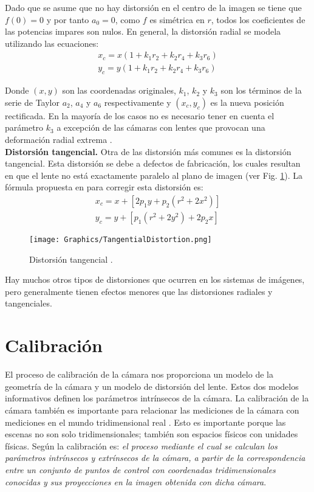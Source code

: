 Dado que se asume que no hay distorsión en el centro de la imagen se tiene que $f(0)=0$ y por tanto $a_0=0$, como $f$ es simétrica en $r$, todos los coeficientes de las potencias impares son nulos. En general, la distorsión radial se modela utilizando las ecuaciones:
\begin{gather*}
    x_c = x(1 + k_1 r_2 + k_2 r_4 + k_3 r_6)\\
    y_c = y(1 + k_1 r_2 + k_2 r_4 + k_3 r_6)
\end{gather*}

Donde $(x, y)$ son las coordenadas originales, $k_1$, $k_2$ y $k_3$ son los términos de la serie de Taylor $a_2$, $a_4$ y $a_6$ respectivamente y $(x_c, y_c)$ es la nueva posición rectificada. En la mayoría de los casos no es necesario tener en cuenta el parámetro $k_3$ a excepción de las cámaras con lentes que provocan una deformación radial extrema \cite{David}.\\

\textbf{Distorsión tangencial.}
Otra de las distorsión más comunes es la distorsión tangencial. Esta distorsión se debe a defectos de fabricación, los cuales resultan en que el lente no está exactamente paralelo al plano de imagen (ver Fig. \ref{fig:TangentialDistortion}). La fórmula propuesta en \cite{GaryAdrian} para corregir esta distorsión es:
\begin{gather*}
    x_c = x + [2p_1y + p_2(r^2 + 2x^2)]\\
    y_c = y + [p_1(r^2 + 2y^2) + 2p_2x]
\end{gather*}

\begin{figure}[h!]
	\centering
	\texttt{[image: Graphics/TangentialDistortion.png]}
	\caption{Distorsión tangencial \cite{David}.}
	\label{fig:TangentialDistortion}
\end{figure}

Hay muchos otros tipos de distorsiones que ocurren en los sistemas de imágenes, pero generalmente tienen efectos menores que las distorsiones radiales y tangenciales.

\section{Calibración}

El proceso de calibración de la cámara nos proporciona un modelo de la geometría de la cámara y un modelo de distorsión del lente. Estos dos modelos informativos definen los parámetros intrínsecos de la cámara. La calibración de la cámara también es importante para relacionar las mediciones de la cámara con mediciones en el mundo tridimensional real \cite{GaryAdrian}. Esto es importante porque las escenas no son solo tridimensionales; también son espacios físicos con unidades físicas. Según \cite{GaryAdrian} la calibración es: \textit{el proceso mediante el cual se calculan los parámetros intrínsecos y extrínsecos de la cámara, a partir de la correspondencia entre un conjunto de puntos de control con coordenadas tridimensionales conocidas y sus proyecciones en la imagen obtenida con dicha cámara}.

